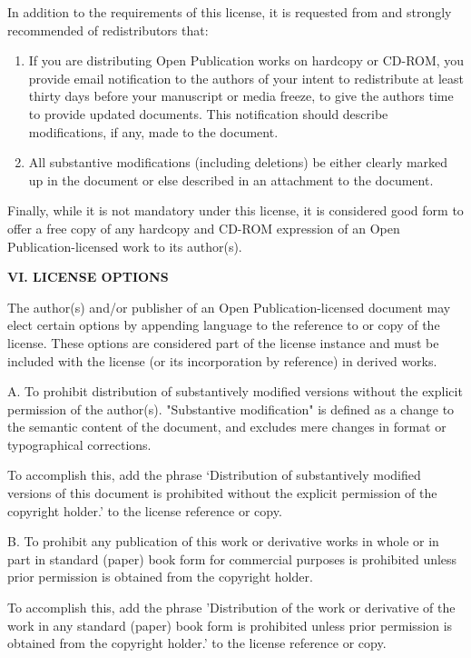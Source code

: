 In addition to the requirements of this license, it is requested from
and strongly recommended of redistributors that:

\begin{enumerate} 

 \item If you are distributing Open Publication works on hardcopy or
 CD-ROM, you provide email notification to the authors of your intent to
 redistribute at least thirty days before your manuscript or media
 freeze, to give the authors time to provide updated documents.  This
 notification should describe modifications, if any, made to the
 document.

 \item All substantive modifications (including deletions) be either
 clearly marked up in the document or else described in an attachment to
 the document.
\end{enumerate}

Finally, while it is not mandatory under this license, it is considered
good form to offer a free copy of any hardcopy and CD-ROM expression of
an Open Publication-licensed work to its author(s).

{\bf VI. LICENSE OPTIONS}

The author(s) and/or publisher of an Open Publication-licensed document
may elect certain options by appending language to the reference to or
copy of the license. These options are considered part of the license
instance and must be included with the license (or its incorporation by
reference) in derived works.

A. To prohibit distribution of substantively modified versions without
the explicit permission of the author(s). "Substantive modification" is
defined as a change to the semantic content of the document, and
excludes mere changes in format or typographical corrections.

To accomplish this, add the phrase `Distribution of substantively
modified versions of this document is prohibited without the explicit
permission of the copyright holder.' to the license reference or copy.

B. To prohibit any publication of this work or derivative works in whole
or in part in standard (paper) book form for commercial purposes is
prohibited unless prior permission is obtained from the copyright
holder.

To accomplish this, add the phrase 'Distribution of the work or
derivative of the work in any standard (paper) book form is prohibited
unless prior permission is obtained from the copyright holder.' to the
license reference or copy.


